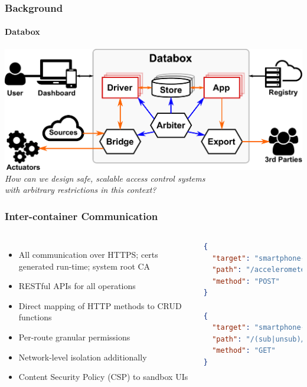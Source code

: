 \documentclass[aspectratio=169]{beamer}
\begin{document}
\begin{frame}
	\frametitle{Background}
	\framesubtitle{Databox}
	\centering
	\includegraphics[width=\linewidth]{architecture7}\\
	\pause
	\textit{How can we design safe, scalable access control systems\\with arbitrary restrictions in this context?}
\end{frame}


\begin{frame}[fragile]
	\frametitle{Inter-container Communication}
	\begin{columns}[c]
		\begin{itemize}
			\item All communication over HTTPS; certs generated run-time; system root CA
			\item RESTful APIs for all operations
			\item Direct mapping of HTTP methods to CRUD functions
			\item Per-route granular permissions
			\item Network-level isolation additionally
			\item Content Security Policy (CSP) to sandbox UIs
		\end{itemize}
		\centering
		\tiny
		\begin{lstlisting}[language=json]
{
  "target": "smartphone-store",
  "path": "/accelerometer/ts/latest",
  "method": "POST"
}

{
  "target": "smartphone-store",
  "path": "/(sub|unsub)/gps/*",
  "method": "GET"
}
		\end{lstlisting}
	\end{columns}
\end{frame}
\end{document}
